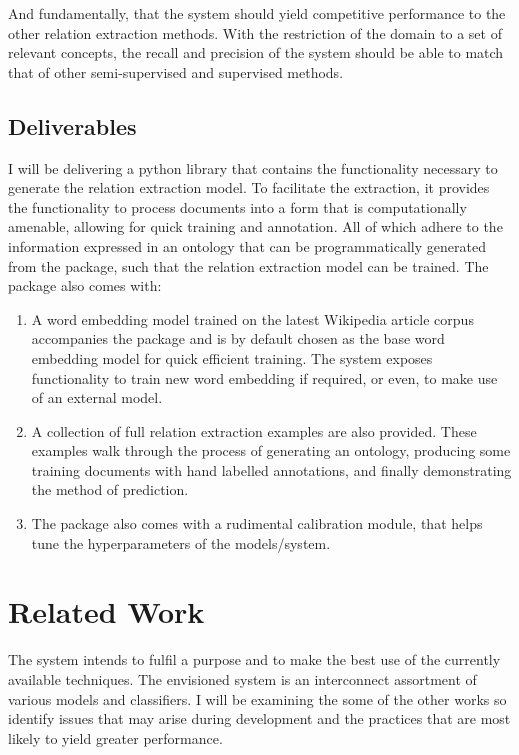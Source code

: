 \documentclass[12pt]{article} %
\begin{document}
And fundamentally, that the system should yield competitive performance to the other relation extraction methods. With the restriction of the domain to a set of relevant concepts, the recall and precision of the system should be able to match that of other semi-supervised and supervised methods.

\subsection{Deliverables}

I will be delivering a python library that contains the functionality necessary to generate the relation extraction model. To facilitate the extraction, it provides the functionality to process documents into a form that is computationally amenable, allowing for quick training and annotation. All of which adhere to the information expressed in an ontology that can be programmatically generated from the package, such that the relation extraction model can be trained. The package also comes with:

\begin{enumerate}
\item A word embedding model trained on the latest Wikipedia article corpus accompanies the package and is by default chosen as the base word embedding model for quick efficient training. The system exposes functionality to train new word embedding if required, or even, to make use of an external model.

\item A collection of full relation extraction examples are also provided. These examples walk through the process of generating an ontology, producing some training documents with hand labelled annotations, and finally demonstrating the method of prediction.

\item The package also comes with a rudimental calibration module, that helps tune the hyperparameters of the models/system.
\end{enumerate}

\section{Related Work}

The system intends to fulfil a purpose and to make the best use of the currently available techniques. The envisioned system is an interconnect assortment of various models and classifiers. I will be examining the some of the other works so identify issues that may arise during development and the practices that are most likely to yield greater performance.
\end{document}
